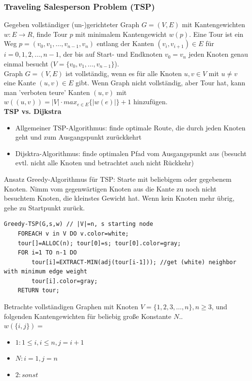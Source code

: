 \documentclass{article}
\begin{document}
            \subsubsection{Traveling Salesperson Problem (TSP)}
                Gegeben vollständiger (un-)gerichteter Graph $G=(V,E)$ mit Kantengewichten $w:E\rightarrow R$, finde Tour $p$ mit minimalem Kantengewicht $w(p)$. Eine Tour ist ein Weg $p=(v_0,v_1,\dots ,v_{n-1},v_n)$ entlang der Kanten $(v_i,v_{i+1})\in E$ für $i=0,1,2,\dots ,n-1$, der bis auf Start- und Endknoten $v_0 = v_n$ jeden Knoten genau einmal besucht ($V=\{v_0,v_1,\dots ,v_{n-1}\}$).\\
                Graph $G=(V,E)$ ist vollständig, wenn es für alle Knoten $u,v\in V$ mit $u\neq v$ eine Kante $(u,v)\in E$ gibt. Wenn Graph nicht vollständig, aber Tour hat, kann man 'verboten teure' Kanten $(u,v)$ mit $w((u,v))=|V|\cdot max_{e\in E}\{|w(e)|\}+1$ hinzufügen.\\
                \textbf{TSP vs. Dijkstra}
                \begin{itemize}
                    \item Allgemeiner TSP-Algorithmus: finde optimale Route, die durch jeden Knoten geht und zum Ausgangspunkt zurückkehrt
                    \item Dijsktra-Algorithmus: finde optimalen Pfad vom Ausgangspunkt aus (besucht evtl. nicht alle Knoten und betrachtet auch nicht Rückkehr)
                \end{itemize}
                Ansatz Greedy-Algorithmus für TSP: Starte mit beliebigem oder gegebenem Knoten. Nimm vom gegenwärtigen Knoten aus die Kante zu noch nicht besuchtem Knoten, die kleinstes Gewicht hat. Wenn kein Knoten mehr übrig, gehe zu Startpunkt zurück.\\
                \begin{lstlisting}[style=pseudocode]
Greedy-TSP(G,s,w) // |V|=n, s starting node
    FOREACH v in V DO v.color=white;
    tour[]=ALLOC(n); tour[0]=s; tour[0].color=gray;
    FOR i=1 TO n-1 DO
        tour[i]=EXTRACT-MIN(adj(tour[i-1])); //get (white) neighbor with minimum edge weight
        tour[i].color=gray;
    RETURN tour;
                \end{lstlisting}
                Betrachte vollständigen Graphen mit Knoten $V=\{1,2,3,\dots ,n\}, n\geq 3$, und folgenden Kantengewichten für beliebig große Konstante $N$..\\
                $w(\{i,j\})=$
                \begin{itemize}
                    \item $1: 1\leq i,i\leq n,j=i+1$
                    \item $N: i=1,j=n$
                    \item $2: sonst$
                \end{itemize}
\end{document}
